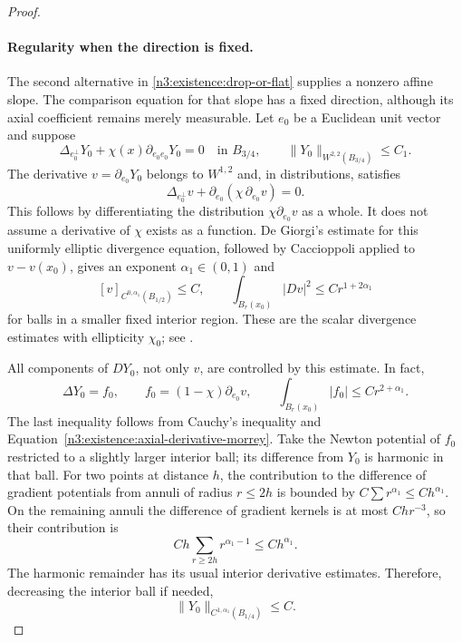 \begin{proof}
\paragraph{Regularity when the direction is fixed.}
The second alternative in \eqref{n3:existence:drop-or-flat} supplies
a nonzero affine slope. The comparison equation for that slope has
a fixed direction, although its axial coefficient remains merely
measurable. Let $e_0$ be a Euclidean unit vector and suppose
\begin{equation}\label{n3:existence:fixed-axis}
 \Delta_{e_0^\perp}Y_0+\chi(x)\partial_{e_0e_0}Y_0=0
 \quad\text{in }B_{3/4},\qquad
 \|Y_0\|_{W^{2,2}(B_{3/4})}\le C_1.
\end{equation}
The derivative $v=\partial_{e_0}Y_0$ belongs to $W^{1,2}$ and,
in distributions, satisfies
\begin{equation}\label{n3:existence:axial-derivative-divergence}
 \Delta_{e_0^\perp}v+
 \partial_{e_0}(\chi\,\partial_{e_0}v)=0.
\end{equation}
This follows by differentiating the distribution $\chi\partial_{e_0}v$
as a whole.  It does not assume a derivative of $\chi$ exists as a
function.  De Giorgi's estimate for this uniformly elliptic
divergence equation, followed by Caccioppoli applied to
$v-v(x_0)$, gives an exponent $\alpha_1\in(0,1)$ and
\begin{equation}\label{n3:existence:axial-derivative-morrey}
 [v]_{C^{0,\alpha_1}(B_{1/2})}\le C,
 \qquad
 \int_{B_r(x_0)}|Dv|^2\le Cr^{1+2\alpha_1}
\end{equation}
for balls in a smaller fixed interior region.  These are the scalar
divergence estimates with ellipticity $\chi_0$; see
\cite[Chapter 8]{GilbargTrudinger2001}.

All components of $DY_0$, not only $v$, are controlled by this
estimate.  In fact,
\begin{equation}\label{n3:existence:poisson-source}
 \Delta Y_0=f_0,\qquad
 f_0=(1-\chi)\partial_{e_0}v,
 \qquad
 \int_{B_r(x_0)}|f_0|\le Cr^{2+\alpha_1}.
\end{equation}
The last inequality follows from Cauchy's inequality and
Equation~\eqref{n3:existence:axial-derivative-morrey}.  Take the Newton
potential of $f_0$ restricted to a slightly larger interior ball;
its difference from $Y_0$ is harmonic in that ball.  For two points
at distance $h$, the contribution to the difference of gradient
potentials from annuli of radius $r\le2h$ is bounded by
$C\sum r^{\alpha_1}\le Ch^{\alpha_1}$.  On the remaining annuli
the difference of gradient kernels is at most $Ch r^{-3}$, so their
contribution is
\begin{equation}\label{n3:existence:potential-annuli}
 C h\sum_{r\ge2h}r^{\alpha_1-1}
 \le Ch^{\alpha_1}.
\end{equation}
The harmonic remainder has its usual interior derivative estimates.
Therefore, decreasing the interior ball if needed,
\begin{equation}\label{n3:existence:model-gradient}
 \|Y_0\|_{C^{1,\alpha_1}(B_{1/4})}\le C.
\end{equation}


\end{proof}
